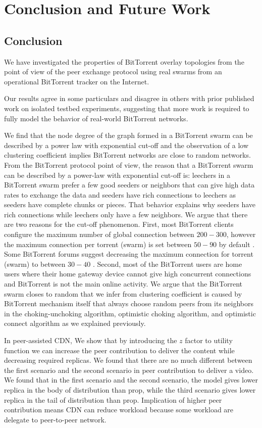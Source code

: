 \chapter{Conclusion and Future Work}

\section{Conclusion}
We have investigated the properties of BitTorrent overlay topologies from the point of view of the peer exchange protocol using real swarms from an operational BitTorrent tracker on the Internet. 

Our results agree in some particulars and disagree in others with prior published work on isolated testbed experiments, suggesting that more work is required to fully model the behavior of real-world BitTorrent networks.

We find that the node degree of the graph formed in a BitTorrent swarm can be described by a power law with exponential cut-off and the observation of a low clustering coefficient implies BitTorrent networks are close to random networks.
From the BitTorrent protocol point of view, the reason that a BitTorrent swarm can be described by a power-law with exponential cut-off is: leechers in a BitTorrent swarm prefer a few good seeders or neighbors that can give high data rates to exchange the data and seeders have rich connections to leechers as seeders have complete chunks or pieces. 
That behavior explains why seeders have rich connections while leechers only have a few neighbors. 
We argue that there are two reasons for the cut-off phenomenon. 
First, most BitTorrent clients configure the maximum number of global connection between $200-300$, however the maximum connection per torrent (swarm) is set between $50 - 90$ by default \cite{clientv}\cite{clientu}.
Some BitTorrent forums suggest decreasing the maximum connection for torrent (swarm) to between $30-40$ \cite{clientf}. 
Second, most of the BitTorrent users are home users where their home gateway device cannot give high concurrent connections and BitTorrent is not the main online activity. 
We argue that the BitTorrent swarm closes to random that we infer from clustering coefficient is caused by BitTorrent mechanism itself that always choose random peers from its neighbors in the choking-unchoking algorithm, optimistic choking algorithm, and optimistic connect algorithm as we explained previously.


In peer-assisted CDN, We show that by introducing the $z$ factor to utility function we can increase the peer contribution to deliver the content while decreasing required replicas. 
We found that there are no much different between the first scenario and the second scenario in peer contribution to deliver a video.
We found that in the first scenario and the second scenario, the model gives lower replica in the body of distribution than prop, while the third scenario gives lower replica in the tail of distribution than prop.
Implication of higher peer contribution means CDN can reduce workload because some workload are delegate to peer-to-peer network.

